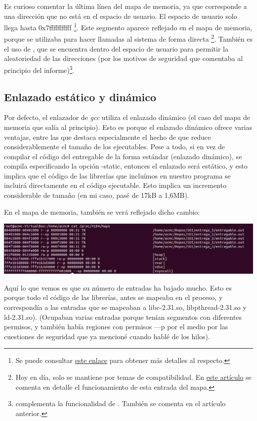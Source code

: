 \documentclass[a4paper]{article}
\begin{document}
Es curioso comentar la última línea del mapa de memoria, ya que corresponde a una dirección que no está en el espacio de usuario. El espacio de usuario solo llega hasta {\ttfamily 0x7fffffffffff} \footnote{Se puede consultar \href{https://www.kernel.org/doc/Documentation/x86/x86_64/mm.txt}{este enlace} para obtener más detalles al respecto.}. Este segmento aparece reflejado en el mapa de memoria, porque se utilizaba para hacer llamadas al sistema de forma directa \footnote{Hoy en día, solo se mantiene por temas de compatibilidad. En \href{https://lwn.net/Articles/446528/}{este artículo} se comenta en detalle el funcionamiento de esta entrada del mapa.}. También es el uso de {\ttfamily [vdso]}, que se encuentra dentro del espacio de usuario para permitir la aleatoriedad de las direcciones (por los motivos de seguridad que comentaba al principio del informe)\footnote{{\ttfamily [vvar]} complementa la funcionalidad de {\ttfamily [vdso]}. También se comenta en el artículo anterior.}.

\subsection{Enlazado estático y dinámico}

Por defecto, el enlazador de \emph{gcc} utiliza el enlazado dinámico (el caso del mapa de memoria que salía al principio). Esto es porque el enlazado dinámico ofrece varias ventajas, entre las que destaca especialmente el hecho de que reduce considerablemente el tamaño de los ejecutables. Pese a todo, si en vez de compilar el código del entregable de la forma estándar (enlazado dinámico), se compila especificando la opción {\ttfamily -static}, entonces el enlazado será estático, y esto implica que el código de las librerías que incluímos en nuestro programa se incluirá directamente en el código ejecutable. Esto implica un incremento considerable de tamaño (en mi caso, pasé de 17kB a 1,6MB).

En el mapa de memoria, también se verá reflejado dicho cambio:

\includegraphics[scale=0.408]{Captura_estatico.png}

Aquí lo que vemos es que su número de entradas ha bajado mucho. Esto es porque todo el código de las librerías, antes se mapeaba en el proceso, y correspondía a las entradas que se mapeaban a {\ttfamily libc-2.31.so}, {\ttfamily libpthread-2.31.so} y {\ttfamily ld-2.31.so}). (Ocupaban varias entradas porque tenían segmentos con diferentes permisos, y también había regiones con permisos {\ttfamily ---p} por el medio por las cuestiones de seguridad que ya mencioné cuando hablé de los hilos).
\end{document}

